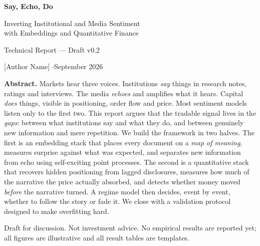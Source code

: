 \documentclass[11pt,a4paper]{article}
\theoremstyle{plain}
\theoremstyle{definition}
\begin{document}
\begin{titlepage}
\centering
\vspace*{2.5cm}
{\Huge\bfseries \textcolor{say}{Say}, \textcolor{echo}{Echo}, \textcolor{do}{Do}\par}
\vspace{0.6cm}
{\Large Inverting Institutional and Media Sentiment\\ with Embeddings and Quantitative Finance\par}
\vspace{1.2cm}
{\large Technical Report --- Draft v0.2\par}
\vspace{0.3cm}
{\normalsize [Author Name] \quad$\cdot$\quad September 2026\par}
\vspace{1.8cm}

\begin{minipage}{0.82\textwidth}
\small
\textbf{Abstract.}
Markets hear three voices. Institutions \emph{say} things in research notes, ratings and interviews. The media \emph{echoes} and amplifies what it hears. Capital \emph{does} things, visible in positioning, order flow and price. Most sentiment models listen only to the first two. This report argues that the tradable signal lives in the \emph{gaps}: between what institutions say and what they do, and between genuinely new information and mere repetition. We build the framework in two halves. The first is an embedding stack that places every document on a \emph{map of meaning}, measures surprise against what was expected, and separates new information from echo using self-exciting point processes. The second is a quantitative stack that recovers hidden positioning from lagged disclosures, measures how much of the narrative the price actually absorbed, and detects whether money moved \emph{before} the narrative turned. A regime model then decides, event by event, whether to follow the story or fade it. We close with a validation protocol designed to make overfitting hard.
\end{minipage}

\vfill
{\footnotesize Draft for discussion. Not investment advice. No empirical results are reported yet; all figures are illustrative and all result tables are templates.\par}
\end{titlepage}

\tableofcontents
\newpage

\end{document}
